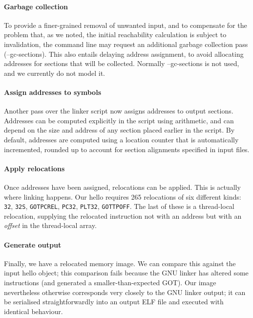 \documentclass[preprint,10pt]{sigplanconf-pldi16}
\begin{document}
\paragraph{Garbage collection} To provide a finer-grained 
removal of unwanted input, and to compensate for the problem that, as we noted,
the initial reachability calculation is subject to invalidation, 
the command line may request an additional garbage collection pass (\textsf{--gc-sections}).
This also entails delaying address assignment, to avoid allocating addresses for sections
that will be collected.
Normally \textsf{--gc-sections} is not used, and we currently do not model it.

\paragraph{Assign addresses to symbols} Another pass over the linker script now
assigns addresses to output sections. 
Addresses can be computed explicitly in the script using arithmetic, and can depend on the size
and address of any section placed earlier in the script. 
By default, addresses are computed using a location counter
that is automatically incremented, rounded up to account for section alignments specified in input files.


\paragraph{Apply relocations} Once addresses have been assigned, relocations can be applied.
This is actually where linking happens. 
Our \textsf{hello} requires 265 relocations of six different kinds: \texttt{32}, \texttt{32S}, \texttt{GOTPCREL}, 
\texttt{PC32}, \texttt{PLT32}, \texttt{GOTTPOFF}.
The last of these is a thread-local relocation, supplying the relocated instruction
not with an address but with an \emph{offset} in the thread-local array.

\paragraph{Generate output} Finally, we have a relocated memory image.
We can compare this against the input \textsf{hello} object; this comparison fails
because the GNU linker has altered some instructions (and generated a smaller-than-expected GOT).
Our image nevertheless otherwise corresponds very closely to the GNU linker output; 
it can be serialised straightforwardly into an output ELF file and executed with identical
behaviour.
\end{document}
